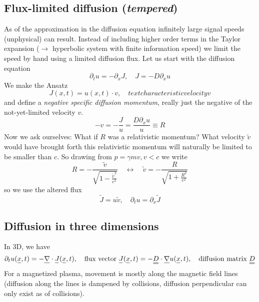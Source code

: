\subsection{Flux-limited diffusion (\textit{tempered})}
As of the approximation in the diffusion equation infinitely large signal speeds 
(unphysical) can result. Instead of including higher order terms in the Taylor expansion 
($\rightarrow$ hyperbolic system with finite information speed) \textcolor{blue1}{we limit the speed by hand 
using a limited diffusion flux}.
Let us start with the diffusion equation
\begin{equation}
    \partial_t u = - \partial_x J, \quad J = - D \partial_x u
\end{equation}
We make the Ansatz
\begin{equation}
    J(x,t) = u(x,t) \cdot v, \quad text{characteristic velocity } v
\end{equation}
and define a \textit{negative specific diffusion momentum}, really just the negative of the
not-yet-limited velocity $v$.
\begin{equation}
    -v = -\frac{J}{u} = \frac{D\partial_x u}{u} \equiv R
\end{equation}
Now we ask ourselves: What if $R$ was a relativistic momentum? What velocity $\tilde{v}$ would have brought forth 
this relativistic momentum will
naturally be limited to be smaller than $c$. So drawing from $p = \gamma m v, v<c$ we write
\begin{equation}
    R = - \frac{\tilde{v}}{\sqrt{1-\frac{\tilde{v}^2}{c^2}}} \quad \leftrightarrow \quad \tilde{v} = -\frac{R}{\sqrt{1+\frac{R^2}{c^2}}}
\end{equation}
so we use the altered flux
\begin{equation}
    \tilde{J} = u \tilde{v}, \quad \partial_t u = \partial_x \tilde{J}
\end{equation}

\subsection{Diffusion in three dimensions}
In 3D, we have
\begin{equation}
    \partial_t u(\vec{x}, t) = -\vec{\nabla} \cdot \vec{J}(\vec{x},t), \quad \text{flux vector } \vec{J}(\vec{x},t) = - \mat{D}\cdot \vec{\nabla} u(\vec{x},t), \quad \text{diffusion matrix } \mat{D}
\end{equation}
For a magnetized plasma, movement is mostly 
along the magnetic field lines (diffusion 
along the lines is dampened by collisions, 
diffusion perpendicular can only exist as of 
collisions).

